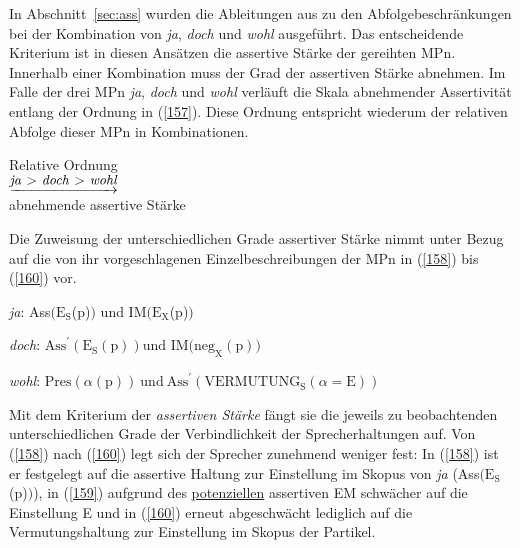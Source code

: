 In Abschnitt~\ref{sec:ass} wurden die Ableitungen aus \citet{Doherty1985, Doherty1987} zu den Abfolgebeschränkungen bei der Kombination von \textit{ja}, \textit{doch} und \textit{wohl} ausgeführt. Das entscheidende Kriterium ist in diesen Ansätzen die assertive Stärke  der ge\-reihten MPn. Innerhalb einer Kombination muss der Grad der assertiven Stärke abnehmen. Im Falle der drei MPn \textit{ja}, \textit{doch} und \textit{wohl} verläuft die Skala abnehmender Assertivität entlang der Ordnung in (\ref{157}). Diese Ordnung entspricht wiederum der relativen Abfolge dieser MPn in Kombinationen.

\begin{exe}
	\ex\label{157} 
	Relative Ordnung\\
	$\underrightarrow{\text{\textit{ja} > \textit{doch} > \textit{wohl}}}$\\
	abnehmende assertive Stärke
\end{exe}	
Die Zuweisung der unterschiedlichen Grade assertiver Stärke nimmt \citet{Doherty1985} unter Bezug auf die von ihr vorgeschlagenen Einzelbeschreibungen der MPn in (\ref{158}) bis (\ref{160}) vor.

\begin{exe}
	\ex\label{158} 
		\textit{ja}: Ass$(\textrm{E}_{\textrm{S}}$(\textrm{p})$)$ und IM$(\textrm{E}_{\textrm{X}}$(\textrm{p})$)$
			\hfill\hbox {\citet[80]{Doherty1985}}
\end{exe}
\vspace{-0.65cm}
\begin{exe}
	\ex\label{159} 
	\textit{doch}: $\textrm{Ass}^{\prime} (\textrm{E}_{\textrm{S}}(\textrm{p})) \textrm{und IM(neg}_{\textrm{X}}(\textrm{p}))$	
	\hfill\hbox {\citet[71]{Doherty1985}}
\end{exe}
\vspace{-0.65cm}
\begin{exe}
	\ex\label{160} 
	\textit{wohl}: $\textrm{Pres}(\alpha (\textrm{p})) \ \textrm{und}\ \textrm{Ass}^{\prime} (\textrm{VERMUTUNG}_{\textrm{S}}(\alpha = \textrm{E}))$
	\hfill\hbox{\citet[82]{Doherty1985}}
\end{exe}
Mit dem Kriterium der \textit{assertiven Stärke}  fängt sie die jeweils zu beobachtenden unterschiedlichen Grade der Verbindlichkeit der Sprecherhaltungen auf. Von (\ref{158}) nach (\ref{160}) legt sich der Sprecher zunehmend weniger fest: In (\ref{158}) ist er festgelegt auf die assertive Haltung zur Einstellung im Skopus von \textit{ja} (Ass$(\textrm{E}_{\textrm{S}}$(\textrm{p})$)$), in (\ref{159}) aufgrund des \underline{potenziellen} assertiven EM schwächer auf die Einstellung E und in (\ref{160}) erneut abgeschwächt lediglich auf die Vermutungshaltung zur Einstellung im Skopus der Partikel. 

